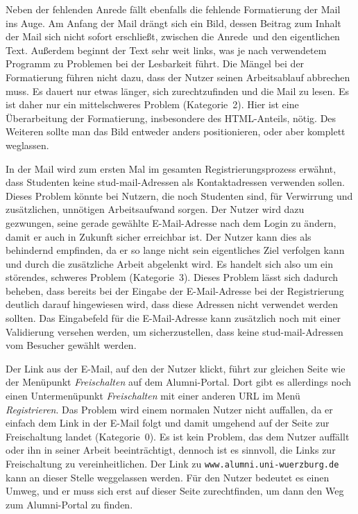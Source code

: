 {
Neben der fehlenden Anrede fällt ebenfalls die fehlende Formatierung der Mail ins Auge. Am Anfang der Mail drängt sich ein Bild, dessen Beitrag zum Inhalt der Mail sich nicht sofort erschließt, zwischen die \glqq Anrede\grqq ~und den eigentlichen Text. Außerdem beginnt der Text sehr weit links, was je nach verwendetem Programm zu Problemen bei der Lesbarkeit führt.
}
{
Die Mängel bei der Formatierung führen nicht dazu, dass der Nutzer seinen Arbeitsablauf abbrechen muss. Es dauert nur etwas länger, sich zurechtzufinden und die Mail zu lesen. Es ist daher nur ein mittelschweres Problem (Kategorie~2).
}
{
Hier ist eine Überarbeitung der Formatierung, insbesondere des HTML-Anteils, nötig. Des Weiteren sollte man das Bild entweder anders positionieren, oder aber komplett weglassen.
}
\label{prob:frei:mailformat}

{
In der Mail wird zum ersten Mal im gesamten Registrierungsprozess erwähnt, dass Studenten keine stud\hbox{-}mail-Adressen als Kontaktadressen verwenden sollen.
}
{
Dieses Problem könnte bei Nutzern, die noch Studenten sind, für Verwirrung und zusätzlichen, unnötigen Arbeitsaufwand sorgen. Der Nutzer wird dazu gezwungen, seine gerade gewählte E\hbox{-}Mail-Adresse nach dem Login zu ändern, damit er auch in Zukunft sicher erreichbar ist. Der Nutzer kann dies als behindernd empfinden, da er so lange nicht sein eigentliches Ziel verfolgen kann und durch die zusätzliche Arbeit abgelenkt wird. Es handelt sich also um ein störendes, schweres Problem (Kategorie~3).
}
{
Dieses Problem lässt sich dadurch beheben, dass bereits bei der Eingabe der E\hbox{-}Mail-Adresse bei der Registrierung deutlich darauf hingewiesen wird, dass diese Adressen nicht verwendet werden sollten. Das Eingabefeld für die E\hbox{-}Mail-Adresse kann zusätzlich noch mit einer Validierung versehen werden, um sicherzustellen, dass keine stud\hbox{-}mail-Adressen vom Besucher gewählt werden.
}
\label{prob:frei:studmail}

{
Der Link aus der E\hbox{-}Mail, auf den der Nutzer klickt, führt zur gleichen Seite wie der Menüpunkt \emph{Freischalten} auf dem Alumni-Portal. Dort gibt es allerdings noch einen Untermenüpunkt \emph{Freischalten} mit einer anderen URL im Menü  \emph{ Registrieren}.
}
{
Das Problem wird einem normalen Nutzer nicht auffallen, da er einfach dem Link in der E\hbox{-}Mail folgt und damit umgehend auf der Seite zur Freischaltung landet (Kategorie~0).
}
{
Es ist kein Problem, das dem Nutzer auffällt oder ihn in seiner Arbeit beeinträchtigt, dennoch ist es sinnvoll, die Links zur Freischaltung zu vereinheitlichen. Der Link zu \texttt{www.alumni.uni-wuerzburg.de} kann an dieser Stelle weggelassen werden. Für den Nutzer bedeutet es einen Umweg, und er muss sich erst auf dieser Seite zurechtfinden, um dann den Weg zum Alumni-Portal zu finden.
}
\label{prob:frei:link}

